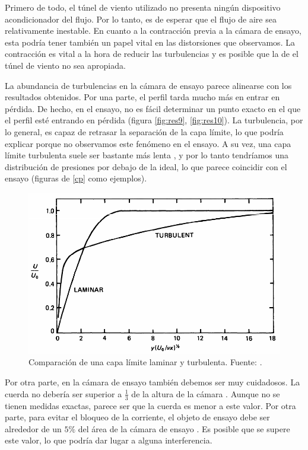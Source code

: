 \documentclass{article}
\begin{document}
Primero de todo, el túnel de viento utilizado no presenta ningún dispositivo acondicionador del flujo. Por lo tanto, es de esperar
que el flujo de aire sea relativamente inestable. En cuanto a la contracción previa a la cámara de ensayo, esta podría tener 
también un papel vital en las distorsiones que observamos. La contracción es vital a la hora de reducir las turbulencias 
\cite{Derbunovich1987} y es posible que la de el túnel de viento no sea apropiada. 

La abundancia de turbulencias en la cámara de ensayo parece alinearse con los resultados obtenidos. Por una parte, el perfil 
tarda mucho más en entrar en pérdida. De hecho, en el ensayo, no es fácil determinar un punto exacto en el que el perfil esté 
entrando en pérdida (figura \ref{fig:res9}, \ref{fig:res10}). La turbulencia, por lo general, es capaz de retrasar la separación 
de la capa límite, lo que podría explicar porque no observamos este fenómeno en el ensayo. A su vez, una capa límite turbulenta suele 
ser bastante más lenta \cite[Capítulo 21.5]{Tritton1988-ei}, y por lo tanto tendríamos una distribución de presiones por debajo de la ideal, lo que parece coincidir 
con el ensayo (figuras de \ref{cp} como ejemplos).

\begin{figure}[h!]
    \centering
    \includegraphics[scale=0.7]{captura.png}
    \caption{Comparación de una capa límite laminar y turbulenta. Fuente: \cite[Capítulo 21.5]{Tritton1988-ei}.}
    \label{fig:capturon}    
\end{figure}

Por otra parte, en la cámara de ensayo también debemos ser muy cuidadosos. La cuerda no debería ser superior a 
$\frac{1}{3}$ de la altura de la cámara \cite{Barlow1999-wm}. Aunque no se tienen medidas exactas, 
parece ser que la cuerda es menor a este valor. 
Por otra parte, para evitar el bloqueo de la corriente, el objeto de ensayo debe ser alrededor de un $5\%$ del área 
de la cámara de ensayo \cite{Barlow1999-wm}. Es posible que se supere este valor, lo que podría dar lugar a alguna interferencia.
\end{document}
